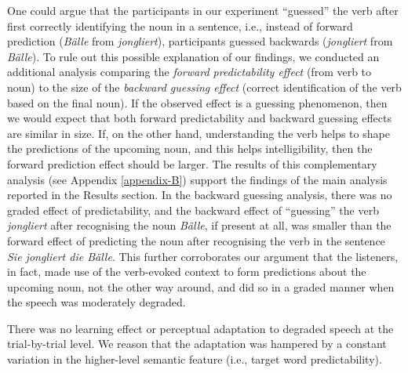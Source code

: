 \documentclass[a4paper, nobind]{templates/ociamthesis}
\begin{document}
One could argue that the participants in our experiment ``guessed'' the verb after first correctly identifying the noun in a sentence,
i.e., instead of forward prediction (\emph{Bälle} from \emph{jongliert}), participants guessed backwards (\emph{jongliert} from \emph{Bälle}).
To rule out this possible explanation of our findings, we conducted an additional analysis comparing the \emph{forward predictability effect} (from verb to noun) to the size of the \emph{backward guessing effect} (correct identification of the verb based on the final noun).
If the observed effect is a guessing phenomenon, then we would expect that both forward predictability and backward guessing effects are similar in size.
If, on the other hand, understanding the verb helps to shape the predictions of the upcoming noun, and this helps intelligibility, then the forward prediction effect should be larger.
The results of this complementary analysis (see Appendix \ref{appendix-B}) support the findings of the main analysis reported in the Results section.
In the backward guessing analysis, there was no graded effect of predictability, and the backward effect of ``guessing'' the verb \emph{jongliert} after recognising the noun \emph{Bälle}, if present at all, was smaller than the forward effect of predicting the noun after recognising the verb in the sentence \emph{Sie jongliert die Bälle}.
This further corroborates our argument that the listeners, in fact, made use of the verb-evoked context to form predictions about the upcoming noun, not the other way around, and did so in a graded manner when the speech was moderately degraded.

There was no learning effect or perceptual adaptation to degraded speech at the trial-by-trial level.
We reason that the adaptation was hampered by a constant variation in the higher-level semantic feature (i.e., target word predictability).
\end{document}
